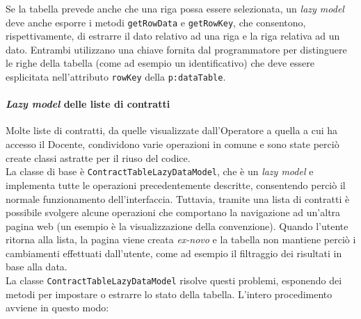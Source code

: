 Se la tabella prevede anche che una riga possa essere selezionata, un \textit{lazy model} deve anche esporre i metodi \lstinline{getRowData} e \lstinline{getRowKey}, che consentono, rispettivamente, di estrarre il dato relativo ad una riga e la riga relativa ad un dato. Entrambi utilizzano una chiave fornita dal programmatore per distinguere le righe della tabella (come ad esempio un identificativo) che deve essere esplicitata nell'attributo \texttt{rowKey} della \lstinline{p:dataTable}.

\paragraph{\textit{Lazy model} delle liste di contratti}
Molte liste di contratti, da quelle visualizzate dall'Operatore a quella a cui ha accesso il Docente, condividono varie operazioni in comune e sono state perciò create classi astratte per il riuso del codice.\\
La classe di base è \lstinline{ContractTableLazyDataModel}, che è un \textit{lazy model} e implementa tutte le operazioni precedentemente descritte, consentendo perciò il normale funzionamento dell'interfaccia. Tuttavia, tramite una lista di contratti è possibile svolgere alcune operazioni che comportano la navigazione ad un'altra pagina web (un esempio è la visualizzazione della convenzione). Quando l'utente ritorna alla lista, la pagina viene creata \textit{ex-novo} e la tabella non mantiene perciò i cambiamenti effettuati dall'utente, come ad esempio il filtraggio dei risultati in base alla data. \\
La classe \lstinline{ContractTableLazyDataModel} risolve questi problemi, esponendo dei metodi per impostare o estrarre lo stato della tabella. L'intero procedimento avviene in questo modo:

